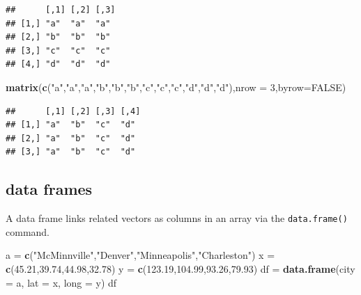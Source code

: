 \documentclass[
]{book}
\newenvironment{Shaded}{\begin{snugshade}}{\end{snugshade}}
\newcommand{\AttributeTok}[1]{\textcolor[rgb]{0.13,0.29,0.53}{#1}}
\newcommand{\ConstantTok}[1]{\textcolor[rgb]{0.56,0.35,0.01}{#1}}
\newcommand{\DecValTok}[1]{\textcolor[rgb]{0.00,0.00,0.81}{#1}}
\newcommand{\FloatTok}[1]{\textcolor[rgb]{0.00,0.00,0.81}{#1}}
\newcommand{\FunctionTok}[1]{\textcolor[rgb]{0.13,0.29,0.53}{\textbf{#1}}}
\newcommand{\NormalTok}[1]{#1}
\newcommand{\OtherTok}[1]{\textcolor[rgb]{0.56,0.35,0.01}{#1}}
\newcommand{\StringTok}[1]{\textcolor[rgb]{0.31,0.60,0.02}{#1}}
\theoremstyle{definition}
\theoremstyle{definition}
\theoremstyle{definition}
\theoremstyle{definition}
\theoremstyle{remark}
\begin{document}
\begin{verbatim}
##      [,1] [,2] [,3]
## [1,] "a"  "a"  "a" 
## [2,] "b"  "b"  "b" 
## [3,] "c"  "c"  "c" 
## [4,] "d"  "d"  "d"
\end{verbatim}

\begin{Shaded}
\begin{Highlighting}[]
\FunctionTok{matrix}\NormalTok{(}\FunctionTok{c}\NormalTok{(}\StringTok{"a"}\NormalTok{,}\StringTok{"a"}\NormalTok{,}\StringTok{"a"}\NormalTok{,}\StringTok{"b"}\NormalTok{,}\StringTok{"b"}\NormalTok{,}\StringTok{"b"}\NormalTok{,}\StringTok{"c"}\NormalTok{,}\StringTok{"c"}\NormalTok{,}\StringTok{"c"}\NormalTok{,}\StringTok{"d"}\NormalTok{,}\StringTok{"d"}\NormalTok{,}\StringTok{"d"}\NormalTok{),}\AttributeTok{nrow =} \DecValTok{3}\NormalTok{,}\AttributeTok{byrow=}\ConstantTok{FALSE}\NormalTok{)}
\end{Highlighting}
\end{Shaded}

\begin{verbatim}
##      [,1] [,2] [,3] [,4]
## [1,] "a"  "b"  "c"  "d" 
## [2,] "a"  "b"  "c"  "d" 
## [3,] "a"  "b"  "c"  "d"
\end{verbatim}

\subsection*{data frames}\label{data-frames}

A data frame links related vectors as columns in an array via the \texttt{data.frame()} command.

\begin{Shaded}
\begin{Highlighting}[]
\NormalTok{a }\OtherTok{=} \FunctionTok{c}\NormalTok{(}\StringTok{"McMinnville"}\NormalTok{,}\StringTok{"Denver"}\NormalTok{,}\StringTok{"Minneapolis"}\NormalTok{,}\StringTok{"Charleston"}\NormalTok{)}
\NormalTok{x }\OtherTok{=} \FunctionTok{c}\NormalTok{(}\FloatTok{45.21}\NormalTok{,}\FloatTok{39.74}\NormalTok{,}\FloatTok{44.98}\NormalTok{,}\FloatTok{32.78}\NormalTok{)}
\NormalTok{y }\OtherTok{=} \FunctionTok{c}\NormalTok{(}\FloatTok{123.19}\NormalTok{,}\FloatTok{104.99}\NormalTok{,}\FloatTok{93.26}\NormalTok{,}\FloatTok{79.93}\NormalTok{)}
\NormalTok{df }\OtherTok{=} \FunctionTok{data.frame}\NormalTok{(}\AttributeTok{city =}\NormalTok{ a, }\AttributeTok{lat =}\NormalTok{ x, }\AttributeTok{long =}\NormalTok{ y)}
\NormalTok{df}
\end{Highlighting}
\end{Shaded}
\end{document}
